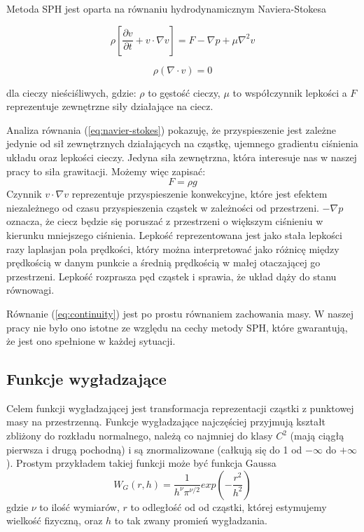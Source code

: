 \documentclass[polish, 12pt]{aghthesis}
\begin{document}
			Metoda SPH jest oparta na równaniu hydrodynamicznym Naviera-Stokesa

			\[{\rho}[\frac{\partial v}{\partial t} + v \cdot \nabla v ]= F - \nabla p + \mu \nabla^2 v \label{eq:navier-stokes} \tag{1}\]

			\[{\rho}(\nabla \cdot v)=0 \label{eq:continuity} \tag{2}\]

			dla cieczy nieściśliwych, gdzie: ${\rho}$ to gęstość cieczy, ${\mu}$ to współczynnik lepkości a $F$ reprezentuje zewnętrzne siły działające na ciecz.
			
			Analiza równania (\ref{eq:navier-stokes}) pokazuję, że przyspieszenie jest zależne jedynie od sił zewnętrznych działających na cząstkę, ujemnego gradientu ciśnienia układu oraz lepkości cieczy. Jedyna siła zewnętrzna, która interesuje nas w naszej pracy to siła grawitacji. Możemy więc zapisać: \[F={\rho}g \label {eq:gravity_force} \tag{3} \] Czynnik $v {\cdot} {\nabla} v$ reprezentuje przyspieszenie konwekcyjne, które jest efektem niezależnego od czasu przyspieszenia cząstek w zależności od przestrzeni. $-{\nabla}p$ oznacza, że ciecz będzie się poruszać z przestrzeni o większym ciśnieniu w kierunku mniejszego ciśnienia. Lepkość reprezentowana jest jako stała lepkości razy laplasjan pola prędkości, który można interpretować jako różnicę między prędkością w danym punkcie a średnią prędkością w małej otaczającej go przestrzeni. Lepkość rozprasza pęd cząstek i sprawia, że układ dąży do stanu równowagi.
			
			Równanie (\ref{eq:continuity}) jest po prostu równaniem zachowania masy. W naszej pracy nie było ono istotne ze względu na cechy metody SPH, które gwarantują, że jest ono spełnione w każdej sytuacji.
			 
		\subsection{Funkcje wygładzające}
			
			Celem funkcji wygładzającej jest transformacja reprezentacji cząstki z punktowej masy na przestrzenną. Funkcje wygładzające najczęściej przyjmują kształt zbliżony do rozkładu normalnego, należą co najmniej do klasy ${C^2}$ (mają ciągłą pierwsza i drugą pochodną) i są znormalizowane (całkują się do 1 od $-{\infty}$ do $+{\infty}$). Prostym przykładem takiej funkcji może być funkcja Gaussa \[W_G(r,h)=\frac{1}{h^{\nu}\pi^{{\nu}/2}}exp(-\frac{r^2}{h^2}) \label{eq:gaussian} \tag{4}\] gdzie ${\nu}$ to ilość wymiarów, $r$ to odległość od od cząstki, której estymujemy wielkość fizyczną, oraz $h$ to tak zwany promień wygładzania.
			
\end{document}
